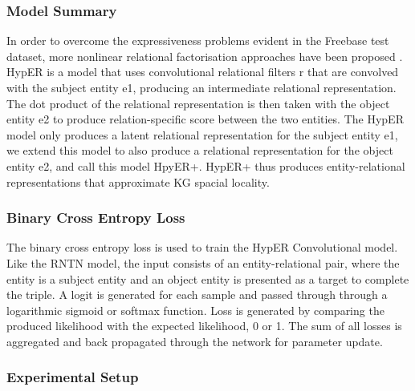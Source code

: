 \subsubsection{Model Summary} 
In order to overcome the expressiveness problems evident in the Freebase test dataset, more nonlinear relational factorisation approaches have been proposed \cite{ComplEx, Neural LP, TorusE}. \newline
HypER is a model that uses convolutional relational filters r that are convolved with the subject entity e1, producing an intermediate relational representation. The dot product of the relational representation is then taken with the object entity e2 to produce relation-specific score between the two entities. The HypER model only produces a latent relational representation for the subject entity e1, we extend this model to also produce a relational representation for the object entity e2, and call this model HpyER+. HypER+ thus produces entity-relational representations that approximate KG spacial locality. \newline
\subsubsection{Binary Cross Entropy Loss}
The binary cross entropy loss \cite{reference} is used to train the HypER Convolutional model. Like the RNTN model, the input consists of an entity-relational pair, where the entity is a subject entity and an object entity is presented as a target to complete the triple. A logit is generated for each sample and passed through through a logarithmic sigmoid or softmax function. Loss is generated by comparing the produced likelihood with the expected likelihood, 0 or 1. The sum of all losses is aggregated and back propagated through the network for parameter update. \newline

\subsubsection{Experimental Setup} 

